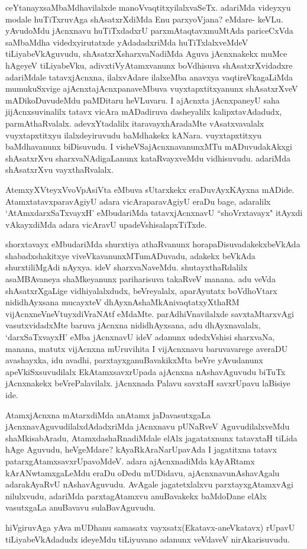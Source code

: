 \begin{artha}
ceYtanayxsaMbaMdhavilalxde manoVvaqtitxyilalxvaSeTx. adariMda videyxyu
modale huTiTxruvAga shAsatxrXdiMda Enu parxyoVjana? eMdare-
keVLu. yAvudoMdu jAcnxnavu huTiTxdadxrU parxmAtaqtavxmuMtAda
pariceCxVda saMbaMdha videdxyirutatxde  yAdadadxriMda huTiTxlalxveMdeV
tiLiyabeVkAguvudu, shAsatxrXsharxvaNadiMda Aguva  jAcnxnakekx muMce
hAgeyeV tiLiyabeVku, adivxtiVyAtamxvanunx boVdhisuva shAsatxrXvidadxre
adariMdale tatavxjAcnxna, ilalxvAdare ilalxeMba anavxya
vaqtireVkagaLiMda mumukuSxvige ajAcnxtajAcnxpanaveMbuva
vuyxtapxtitxyanunx shAsatxrXveV mADikoDuvudeMdu paMDitaru heVLuvaru. I
ajAcnxta jAcnxpaneyU saha jijAcnxsuvinalilx tatavx vicAra mADadiruva
dasheyalilx kalipxtavAdadudx, parmAthaRvalalx. adevxYtadalilx
itaravayxhAradaMte vAsatxvavalalx vuyxtapxtitxyu ilalxdeyiruvudu
baMdhakekx kANara. vuyxtapxtitxyu baMdhavanunx biDisuvudu. I
visheVSajAcnxnavanunxMTu mADuvudakAkxgi shAsatxrXvu
sharxvaNAdigaLanunx kataRvayxveMdu vidhisuvudu. adariMda shAsatxrXvu vayxthaRvalalx.  

AtemxyXVteyxVvoVpAsiVta eMbuva sUtarxkekx eraDuvAyxKAyxna
mADide. AtamxtatavxparavAgiyU adara vicAraparavAgiyU eraDu bage,
adaralilx `AtAmxdarxSaTxvayxH' eMbudariMda tatavxjAcnxnavU ``shoVrxtavayx" itAyxdi
vAkayxdiMda adara vicAravU upadeVshisalapxTiTxde.

shorxtavayx eMbudariMda shurxtiya athaRvanunx
horapaDisuvadakekxbeVkAda shabadxshakitxye viveVkavanunxMTumADuvadu,
adakekx beVkAda shurxtiliMgAdi nAyxya. ideV
sharxvaNaveMdu. shutayxthaRdalilx asaMBAvaneya shaMkeyanunx
pariharisuva takaRveV manana. adu veVda shAsatxrXgaLige
vidhiyalalxdudx, beVreyalalx, aparAyutatx  boVdhoV\s tarx
nididhAyxsana mucayxteV dhAyxnAshaMkAnivaqtatxyXthaRM
vijAcnxneVneVtuyxdiVraNAtf eMdaMte. parAdhiVnavilalxde savxtaMtarxvAgi
vasutxvidadxMte baruva jAcnxna nididhAyxsana, adu dhAyxnavalalx,
`darxSaTxvayxH' eMba jAcnxnavU ideV adanunx udedxVshisi sharxvaNa, manana,
matutx vijAcnxna mUruvihita I vijAcnxnavu baruvavarege averaDU
avashayxka, idu avadhi, parxtayxganuBavakikxMta beVre yAvudanunx
apeVkiSxsuvudilalx EkAtamxsavxrUpada ajAcnxna nAshavAguvudu biTuTx
jAcnxnakekx beVrePalavilalx. jAcnxnada Palavu savxtaH
savxrUpavu laBisiye ide.
\end{artha}

\begin{artha}
AtamxjAcnxna mAtarxdiMda anAtamx jaDavasutxgaLa
jAcnxnavAguvudilalxdAdadxriMda  jAcnxnavu pUNaRveV AguvudilalxveMdu
shaMkisabAradu, AtamxdashaRnadiMdale elAlx jagatatxnunx tatavxtaH
tiLida hAge Aguvudu, heVgeMdare? kAyaRkAraNarUpavAda I jagatitxna
tatavx patarxgAtamxsavxrUpavoMdeV. adara ajAcnxnadiMda kAyARtamx
kArANwtamxgaLeMdu eraDu oDedu mUDidavu, ajAcnxnavunAshavAgalu
adarakAyaRvU nAshavAguvudu. AvAgale jagatetxlalxvu parxtayxgAtamxvAgi
nilulxvudu, adariMda parxtagAtamxvu anuBavakekx baMdoDane elAlx
vasutxgaLa anuBavavu sulaBavAguvudu.

hiVgiruvAga yAva mUDhanu samasatx vayxsatx(Ekatavx-aneVkatavx) rUpavU
tiLiyabeVkAdadudx ideyeMdu tiLiyuvano adanunx veVdaveV nirAkarisuvudu.
\end{artha}

